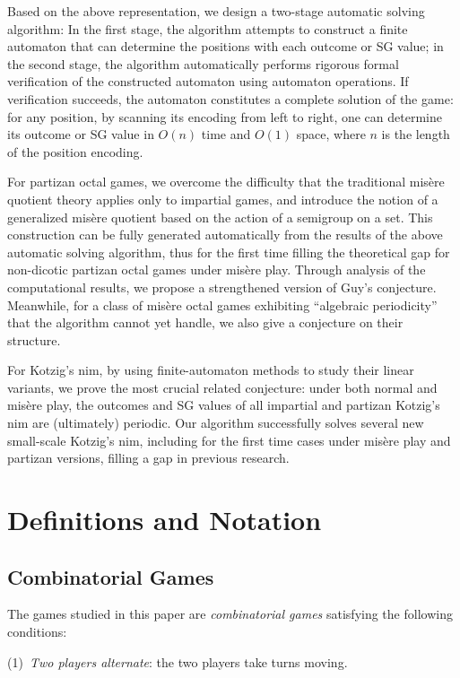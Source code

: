 \documentclass[11pt]{article}
\theoremstyle{definition}
\theoremstyle{plain}
\begin{document}
Based on the above representation, we design a two-stage automatic solving algorithm:
In the first stage, the algorithm attempts to construct a finite automaton that can determine the positions with each outcome or SG value;
in the second stage, the algorithm automatically performs rigorous formal verification of the constructed automaton using automaton operations.
If verification succeeds, the automaton constitutes a complete solution of the game: for any position, by scanning its encoding from left to right, one can determine its outcome or SG value in $O(n)$ time and $O(1)$ space, where $n$ is the length of the position encoding.

For partizan octal games, we overcome the difficulty that the traditional misère quotient theory applies only to impartial games, and introduce the notion of a generalized misère quotient based on the action of a semigroup on a set.
This construction can be fully generated automatically from the results of the above automatic solving algorithm, thus for the first time filling the theoretical gap for non-dicotic partizan octal games under misère play.
Through analysis of the computational results, we propose a strengthened version of Guy's conjecture.
Meanwhile, for a class of misère octal games exhibiting ``algebraic periodicity'' that the algorithm cannot yet handle, we also give a conjecture on their structure.

For Kotzig's nim, by using finite-automaton methods to study their linear variants, we prove the most crucial related conjecture:
under both normal and misère play, the outcomes and SG values of all impartial and partizan Kotzig's nim are (ultimately) periodic.
Our algorithm successfully solves several new small-scale Kotzig's nim, including for the first time cases under misère play and partizan versions, filling a gap in previous research.

\section{Definitions and Notation}
\subsection{Combinatorial Games}

The games studied in this paper are \textit{combinatorial games} satisfying the following conditions:

(1)~\textit{Two players alternate}: the two players take turns moving.
\end{document}
